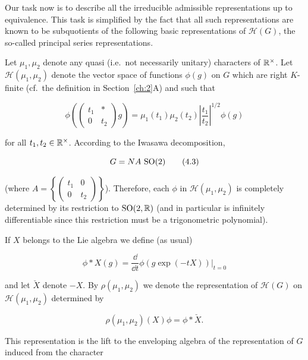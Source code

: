 Our task now is to describe all the irreducible admissible representations up to equivalence. This task is simplified by the fact that all such representations are known to be subquotients of the following basic representations of $\mathcal{H}(G)$, the so-called principal series representations.

Let $\mu_1, \mu_2$ denote any quasi (i.e.\ not necessarily unitary) characters of $\mathbb{R}^{\times}$. Let $\mathcal{H}(\mu_1, \mu_2)$ denote the vector space of functions $\phi(g)$ on $G$ which are right $K$-finite (cf.\ the definition in Section~\ref{ch:2}A) and such that

\begin{equation}\label{eq:4.2}
\phi\!\left(\begin{pmatrix} t_1 & * \\ 0 & t_2 \end{pmatrix} g\right) = \mu_1(t_1)\mu_2(t_2)\left|\frac{t_1}{t_2}\right|^{1/2}\phi(g)\tag{4.2}
\end{equation}

for all $t_1, t_2 \in \mathbb{R}^{\times}$. According to the Iwasawa decomposition,

\begin{equation}\label{eq:4.3}
G = NA\,\operatorname{SO}(2)\tag{4.3}
\end{equation}

(where $A = \left\{\begin{pmatrix} t_1 & 0 \\ 0 & t_2 \end{pmatrix}\right\}$). Therefore, each $\phi$ in $\mathcal{H}(\mu_1, \mu_2)$ is completely determined by its restriction to $\operatorname{SO}(2,\mathbb{R})$ (and in particular is infinitely differentiable since this restriction must be a trigonometric polynomial).

If $X$ belongs to the Lie algebra we define (as usual)

\begin{equation}\label{eq:4.4}
\phi * X(g) = \frac{\dd}{\dd t} \phi(g \exp(-tX))\big|_{t=0}\tag{4.4}
\end{equation}

and let $\check{X}$ denote $-X$. By $\rho(\mu_1, \mu_2)$ we denote the representation of $\mathcal{H}(G)$ on $\mathcal{H}(\mu_1, \mu_2)$ determined by

\begin{equation}\label{eq:4.5}
\rho(\mu_1, \mu_2)(X)\phi = \phi * \check{X}.\tag{4.5}
\end{equation}

This representation is the lift to the enveloping algebra of the representation of $G$ induced from the character

